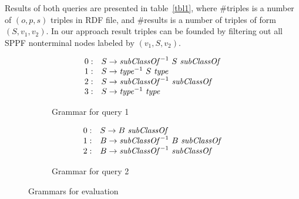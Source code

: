 Results of both queries are presented in table~\ref{tbl1}, where \#triples is a number of $(o,p,s)$ triples in RDF file, and \#results is a number of triples of form $(S,v_1,v_2)$.
In our approach result triples can be founded by filtering out all SPPF nonterminal nodes labeled by $(v_1,S,v_2)$.

\begin{figure*}[ht]
   \begin{center}
   \centering
   \begin{subfigure}[b]{0.4\textwidth}

   \[
\begin{array}{rl}
   0: & S \rightarrow \text{\textit{subClassOf}}^{-1} \ S \ \text{\textit{subClassOf}} \\ 
   1: & S \rightarrow \text{\textit{type}}^{-1} \ S \ \text{\textit{type}} \\ 
   2: & S \rightarrow \text{\textit{subClassOf}}^{-1} \ \text{\textit{subClassOf}} \\ 
   3: & S \rightarrow \text{\textit{type}}^{-1} \ \text{\textit{type}} \\ 
\end{array}
\]
   \caption{Grammar for query 1}
   \label{grammarQ1}
   \end{subfigure}
   \hspace{2em}
   \begin{subfigure}[b]{0.4\textwidth}
   \[
\begin{array}{rl}
   0: & S \rightarrow B \ \text{\textit{subClassOf}} \\ 
   1: & B \rightarrow \text{\textit{subClassOf}}^{-1} \ B \ \text{\textit{subClassOf}} \\
   2: & B \rightarrow \text{\textit{subClassOf}}^{-1} \ \text{\textit{subClassOf}} \\ 
\end{array}
\]
   \caption{Grammar for query 2}
   \label{grammarQ2}        
   \end{subfigure}
   \end{center}
   \caption{Grammars for evaluation}
    \label{GrammarsForEvaluation}
\end{figure*}



